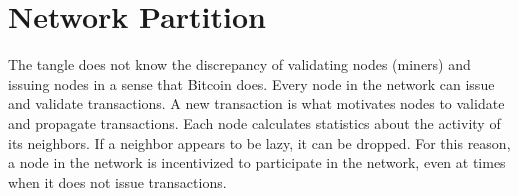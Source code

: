 \section{Network Partition}

The tangle does not know the discrepancy of validating nodes (miners) and issuing nodes in a sense that Bitcoin does. Every node in the network can issue and validate transactions. A new transaction is  
what motivates nodes to validate and propagate transactions. Each node calculates statistics about the activity of its neighbors. If a neighbor appears to be lazy, it can be dropped. For this reason, a node in the network is incentivized to participate in the network, even at times when it does not issue transactions. 
